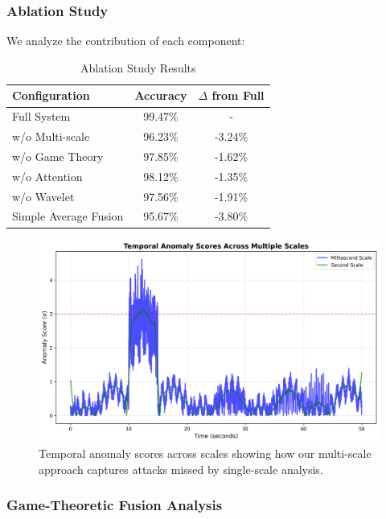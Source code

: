 \documentclass[10pt,conference]{IEEEtran}
\begin{document}
\subsubsection{Ablation Study}

We analyze the contribution of each component:

\begin{table}[!t]
\centering
\caption{Ablation Study Results}
\label{tab:ablation}
\begin{tabular}{lcc}
\toprule
\textbf{Configuration} & \textbf{Accuracy} & \textbf{$\Delta$ from Full} \\
\midrule
Full System & 99.47\% & - \\
w/o Multi-scale & 96.23\% & -3.24\% \\
w/o Game Theory & 97.85\% & -1.62\% \\
w/o Attention & 98.12\% & -1.35\% \\
w/o Wavelet & 97.56\% & -1.91\% \\
Simple Average Fusion & 95.67\% & -3.80\% \\
\bottomrule
\end{tabular}
\end{table}

\begin{figure}[!t]
\centering
\includegraphics[width=\columnwidth]{figures/anomaly_scores.png}
\caption{Temporal anomaly scores across scales showing how our multi-scale approach captures attacks missed by single-scale analysis.}
\label{fig:anomalyscores}
\end{figure}

\subsubsection{Game-Theoretic Fusion Analysis}
\end{document}
